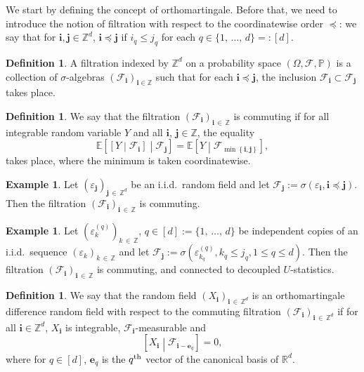 \documentclass[10pt]{amsart}
\theoremstyle{definition}\newtheorem{defi}[theo]{Definition}\newtheorem{rema}[theo]{Remark}\newtheorem{exam}[theo]{Example}\newtheorem{exem}[theo]{Example}\newtheorem{nota}[theo]{Notation}
\newcommand{\f}{\mathcal{F}}
\newcommand\R{\mathbb{R}}
\newcommand\PP{\mathbb{P}}
\newcommand\Z{\mathbb{Z}}
\newcommand{\bbE}{\mathbb{E}}
\newcommand\ens[1]{\{ #1\}}
\newcommand{\pr}[1]{(#1)}
\newcommand\eps{\varepsilon}
\newcommand{\gr}[1]{\bm{#1}}
\newcommand{\gri}{\bm{i}}
\newcommand{\grj}{\bm{j}}
\newcommand{\imd}{\preccurlyeq}
\begin{document}
We start by defining the concept of orthomartingale. Before that, we need to introduce the notion of filtration with respect to the coordinatewise order $\imd$: we say that for $\gri,\grj\in\Z^d$, $\gri\imd\grj$ if $i_q\leq j_q$ for each $q\in \ens{1,\,\dots,\,d}=:[d]$.

\begin{defi}
A filtration indexed by $\Z^d$ on a probability space $\pr{\Omega,\f,\PP}$ is a collection of $\sigma$-algebras $\pr{\f_{\gri}}_{\gri\in \Z}$ such that for each $\gri\imd\grj$, the inclusion $\f_{\gri}\subset
\f_{\grj}$ takes place.
\end{defi}

\begin{defi}
We say that the filtration $\pr{\f_{\gri}}_{\gri\,\in\,\Z}$ is commuting if for all integrable random variable $Y$ and all $\gri$, $\grj\in\Z$, the equality
\begin{equation}
\bbE\left[\left[Y\middle| \f_{\gri}\right]\middle|\f_{\grj}\right] = \bbE\left[Y\middle| \f_{\min\left\{\gri,\grj\right\}}\right],
\end{equation}
takes place, where the minimum is taken coordinatewise.
\end{defi}

\begin{exam}
Let $\pr{\eps_{\grj}}_{\grj\,\in\,\Z^d}$ be an i.i.d.\ random field and let $\f_{\grj}:=\sigma\pr{\eps_{\gri},\gri\imd\grj}$. Then the filtration $\pr{\f_{\gri}}_{\gri\,\in\,\Z}$ is commuting.
\end{exam}

\begin{exam}
Let $\pr{\eps_k^{\pr{q}}}_{k\,\in\,\Z}$, $q\in [d]:=\ens{1,\,\dots,\,d}$ be independent copies of an i.i.d.\ sequence $\pr{\eps_k}_{k\,\in\,\Z}$ and let $\f_{\grj}:=\sigma\pr{\eps_{k_q}^{\pr{q}},k_q\leq j_q,1\leq q\leq d}$. Then the filtration $\pr{\f_{\gri}}_{\gri\,\in\,\Z}$ is commuting, and connected to decoupled $U$-statistics.
\end{exam}


\begin{defi}
We say that the random field $\pr{X_{\gri}}_{\gri\,\in\,\Z^d}$ is an orthomartingale difference random field with respect to the commuting filtration $\pr{\f_{\gri}}_{\gri\,\in\,\Z^d}$ if for all $\gri\in\Z^d$, $X_{\gri}$ is integrable, $\f_{\gri}$-measurable and
\begin{equation}
\left[X_{\gri}\middle| \f_{\gri-\gr{e}_q}\right]=0,
\end{equation}
where for $q\in [d]$, $\gr{e}_q$ is the $q^{\rm th}$ vector of the canonical basis of $\R^d$.
\end{defi}
\end{document}
